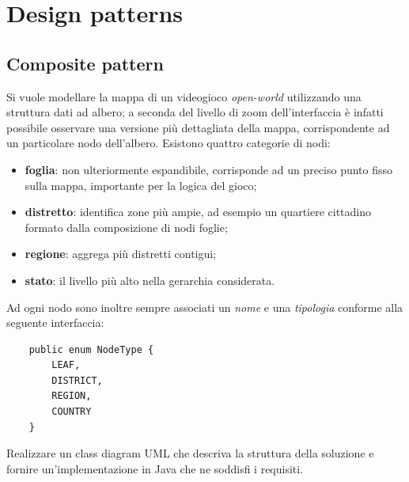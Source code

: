 \documentclass[12pt,a4paper]{article}
\begin{document}
\tableofcontents
\clearpage
	
\section{Design patterns}
    \subsection{Composite pattern}
    
    \begin{Exercise}\label{composite:ex1}
        Si vuole modellare la mappa di un videogioco \textit{open-world} utilizzando una struttura dati ad albero; a seconda del livello di zoom dell'interfaccia è infatti possibile osservare una versione più dettagliata della mappa, corrispondente ad un particolare nodo dell'albero.
        Esistono quattro categorie di nodi:
        \begin{itemize}
            \item \textbf{foglia}: non ulteriormente espandibile, corrisponde ad un preciso punto fisso sulla mappa, importante per la logica del gioco;
            \item \textbf{distretto}: identifica zone più ampie, ad esempio un quartiere cittadino formato dalla composizione di nodi foglie;
            \item \textbf{regione}: aggrega più distretti contigui;
            \item \textbf{stato}: il livello più alto nella gerarchia considerata.
        \end{itemize}
        Ad ogni nodo sono inoltre sempre associati un \textit{nome} e una \textit{tipologia} conforme alla seguente interfaccia:
        \begin{lstlisting}
    public enum NodeType {
        LEAF,
        DISTRICT,
        REGION,
        COUNTRY
    }
        \end{lstlisting}
        
        Realizzare un class diagram UML che descriva la struttura della soluzione e fornire un'implementazione in Java che ne soddisfi i requisiti.
    \end{Exercise}

\end{document}
